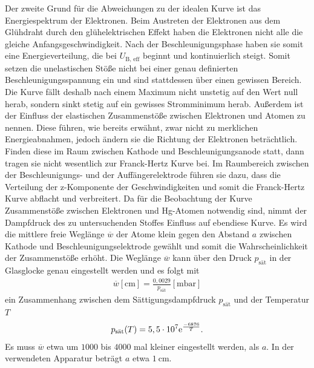 \noindent
Der zweite Grund für die Abweichungen zu der idealen Kurve ist das Energiespektrum der Elektronen. Beim Austreten der Elektronen aus dem Glühdraht durch den glühelektrischen Effekt haben die Elektronen nicht alle die gleiche Anfangsgeschwindigkeit.
Nach der Beschleunigungsphase haben sie somit eine Energieverteilung, die bei $U_{\text{B, eff}}$ beginnt und kontinuierlich steigt. Somit setzen die unelastischen Stöße nicht bei einer genau definierten Beschleunigungsspannung ein und sind stattdessen über einen gewissen Bereich.
Die Kurve fällt deshalb nach einem Maximum nicht unstetig auf den Wert null herab, sondern sinkt stetig auf ein gewisses Stromminimum herab.
Außerdem ist der Einfluss der elastischen Zusammenstöße zwischen Elektronen und Atomen zu nennen. Diese führen, wie bereits erwähnt, zwar nicht zu merklichen Energieabnahmen, jedoch ändern sie die Richtung der Elektronen beträchtlich.
Finden diese im Raum zwischen Kathode und Beschleunigungsanode statt, dann tragen sie nicht wesentlich zur Franck-Hertz Kurve bei. Im Raumbereich zwischen der Beschleunigungs- und der Auffängerelektrode führen sie dazu, dass die Verteilung der z-Komponente der Geschwindigkeiten und somit die Franck-Hertz Kurve abflacht und verbreitert.
Da für die Beobachtung der Kurve Zusammenstöße zwischen Elektronen und Hg-Atomen notwendig sind, nimmt der Dampfdruck des zu untersuchenden Stoffes Einfluss auf ebendiese Kurve.
Es wird die mittlere freie Weglänge $\overline w$ der Atome klein gegen den Abstand $a$ zwischen Kathode und Beschleunigungselektrode gewählt und somit die Wahrscheinlichkeit der Zusammenstöße erhöht. Die Weglänge $\overline w$ kann über den Druck $p_{\text{sät}}$
in der Glasglocke genau eingestellt werden und es folgt mit
\begin{align*}
    \overline w [\si{\centi\meter}] = \frac{0,0029}{p_{\text{sät}}} [\si{\milli\bar}]
\end{align*}
ein Zusammenhang zwischen dem Sättigungsdampfdruck $p_{\text{sät}}$ und der Temperatur $T$
\begin{align}
    p_{\text{sät}}(T) = 5,5\cdot 10^{7} \text e^{\frac{-6876}{T}}.
\end{align}
Es muss $\overline w$ etwa um $1000$ bis $4000$ mal kleiner eingestellt werden, als $a$. In der verwendeten Apparatur beträgt $a$ etwa $\SI{1}{\centi\meter}$.